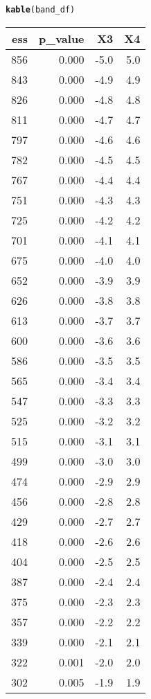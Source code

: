 \documentclass[11pt,leqno]{article}\usepackage[]{graphicx}\usepackage[]{color}
\makeatletter
\newcommand{\hlstd}[1]{\textcolor[rgb]{0.345,0.345,0.345}{#1}}%
\newcommand{\hlkwd}[1]{\textcolor[rgb]{0.737,0.353,0.396}{\textbf{#1}}}%
\newenvironment{kframe}{%
 \def\at@end@of@kframe{}%
 \ifinner\ifhmode%
  \def\at@end@of@kframe{\end{minipage}}%
  \begin{minipage}{\columnwidth}%
 \fi\fi%
 \def\FrameCommand##1{\hskip\@totalleftmargin \hskip-\fboxsep
 \colorbox{shadecolor}{##1}\hskip-\fboxsep
     \hskip-\linewidth \hskip-\@totalleftmargin \hskip\columnwidth}%
 \MakeFramed {\advance\hsize-\width
   \@totalleftmargin\z@ \linewidth\hsize
   \@setminipage}}%
 {\par\unskip\endMakeFramed%
 \at@end@of@kframe}
\newenvironment{knitrout}{}{} %
\theoremstyle{newstyle}
\makeatother
\begin{document}
\begin{knitrout}
\begin{kframe}
\begin{alltt}
\hlkwd{kable}\hlstd{(band_df)}
\end{alltt}
\end{kframe}
\begin{tabular}{r|r|r|r}
\hline
ess & p\_value & X3 & X4\\
\hline
856 & 0.000 & -5.0 & 5.0\\
\hline
843 & 0.000 & -4.9 & 4.9\\
\hline
826 & 0.000 & -4.8 & 4.8\\
\hline
811 & 0.000 & -4.7 & 4.7\\
\hline
797 & 0.000 & -4.6 & 4.6\\
\hline
782 & 0.000 & -4.5 & 4.5\\
\hline
767 & 0.000 & -4.4 & 4.4\\
\hline
751 & 0.000 & -4.3 & 4.3\\
\hline
725 & 0.000 & -4.2 & 4.2\\
\hline
701 & 0.000 & -4.1 & 4.1\\
\hline
675 & 0.000 & -4.0 & 4.0\\
\hline
652 & 0.000 & -3.9 & 3.9\\
\hline
626 & 0.000 & -3.8 & 3.8\\
\hline
613 & 0.000 & -3.7 & 3.7\\
\hline
600 & 0.000 & -3.6 & 3.6\\
\hline
586 & 0.000 & -3.5 & 3.5\\
\hline
565 & 0.000 & -3.4 & 3.4\\
\hline
547 & 0.000 & -3.3 & 3.3\\
\hline
525 & 0.000 & -3.2 & 3.2\\
\hline
515 & 0.000 & -3.1 & 3.1\\
\hline
499 & 0.000 & -3.0 & 3.0\\
\hline
474 & 0.000 & -2.9 & 2.9\\
\hline
456 & 0.000 & -2.8 & 2.8\\
\hline
429 & 0.000 & -2.7 & 2.7\\
\hline
418 & 0.000 & -2.6 & 2.6\\
\hline
404 & 0.000 & -2.5 & 2.5\\
\hline
387 & 0.000 & -2.4 & 2.4\\
\hline
375 & 0.000 & -2.3 & 2.3\\
\hline
357 & 0.000 & -2.2 & 2.2\\
\hline
339 & 0.000 & -2.1 & 2.1\\
\hline
322 & 0.001 & -2.0 & 2.0\\
\hline
302 & 0.005 & -1.9 & 1.9\\

\end{tabular}
\end{knitrout}
\end{document}
